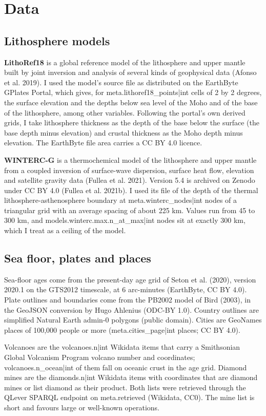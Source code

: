 \documentclass[11pt,a4paper]{article}
\begin{document}
\section{Data}

\subsection{Lithosphere models}

\textbf{LithoRef18} is a global reference model of the lithosphere and upper mantle built by joint inversion and analysis of several kinds of geophysical data (Afonso et al. 2019). I used the model's source file as distributed on the EarthByte GPlates Portal, which gives, for {{meta.lithoref18_points|int}} cells of 2 by 2 degrees, the surface elevation and the depths below sea level of the Moho and of the base of the lithosphere, among other variables. Following the portal's own derived grids, I take lithosphere thickness as the depth of the base below the surface (the base depth minus elevation) and crustal thickness as the Moho depth minus elevation. The EarthByte file area carries a CC BY 4.0 licence.

\textbf{WINTERC-G} is a thermochemical model of the lithosphere and upper mantle from a coupled inversion of surface-wave dispersion, surface heat flow, elevation and satellite gravity data (Fullea et al. 2021). Version 5.4 is archived on Zenodo under CC BY 4.0 (Fullea et al. 2021b). I used its file of the depth of the thermal lithosphere-asthenosphere boundary at {{meta.winterc_nodes|int}} nodes of a triangular grid with an average spacing of about 225 km. Values run from 45 to 300 km, and {{models.winterc.max.n_at_max|int}} nodes sit at exactly 300 km, which I treat as a ceiling of the model.

\subsection{Sea floor, plates and places}

Sea-floor ages come from the present-day age grid of Seton et al. (2020), version 2020.1 on the GTS2012 timescale, at 6 arc-minutes (EarthByte, CC BY 4.0). Plate outlines and boundaries come from the PB2002 model of Bird (2003), in the GeoJSON conversion by Hugo Ahlenius (ODC-BY 1.0). Country outlines are simplified Natural Earth admin-0 polygons (public domain). Cities are GeoNames places of 100,000 people or more ({{meta.cities_page|int}} places; CC BY 4.0).

Volcanoes are the {{volcanoes.n|int}} Wikidata items that carry a Smithsonian Global Volcanism Program volcano number and coordinates; {{volcanoes.n_ocean|int}} of them fall on oceanic crust in the age grid. Diamond mines are the {{diamonds.n|int}} Wikidata items with coordinates that are diamond mines or list diamond as their product. Both lists were retrieved through the QLever SPARQL endpoint on {{meta.retrieved}} (Wikidata, CC0). The mine list is short and favours large or well-known operations.
\end{document}
